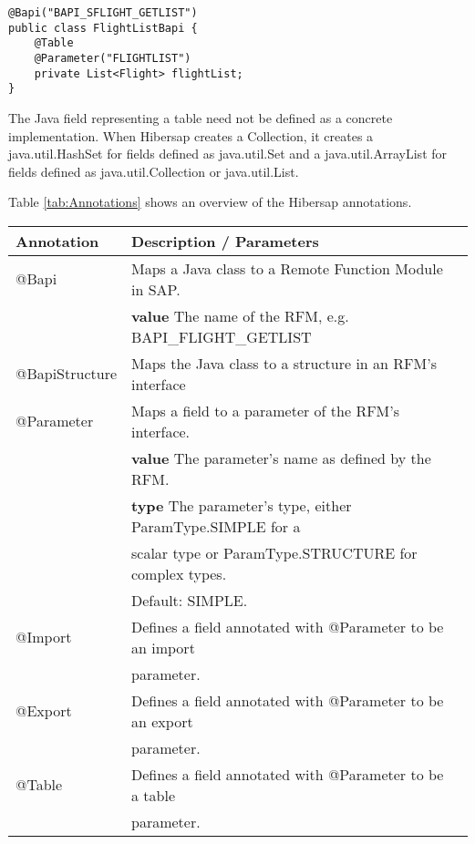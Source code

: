 \begin{Verbatim}[frame=single]
@Bapi("BAPI_SFLIGHT_GETLIST") 
public class FlightListBapi {
    @Table 
    @Parameter("FLIGHTLIST") 
    private List<Flight> flightList;
}
\end{Verbatim}

The Java field representing a table need not be defined as a concrete implementation. When Hibersap creates a Collection, it creates a java.util.HashSet for fields defined as java.util.Set and a java.util.ArrayList for fields defined as java.util.Collection or java.util.List.

Table \ref{tab:Annotations} shows an overview of the Hibersap annotations.

\begin{table}[H]
  \centering
  \begin{tabular}{lll} \toprule 
    \textbf{Annotation}     & \textbf{Description / Parameters} \\ \midrule
    @Bapi                   & Maps a Java class to a Remote Function Module in SAP.\\
                            & \textbf{value} The name of the RFM, e.g. BAPI\_FLIGHT\_GETLIST\\ 
    @BapiStructure          & Maps the Java class to a structure in an RFM's interface \\
    @Parameter              & Maps a field to a parameter of the RFM's interface.\\
                            & \textbf{value} The parameter's name as defined by the RFM. \\
                            & \textbf{type} The parameter's type, either ParamType.SIMPLE for a \\
                            &               scalar type or ParamType.STRUCTURE for complex types. \\
                            &               Default: SIMPLE. \\
    @Import                 & Defines a field annotated with @Parameter to be an import \\
                            & parameter. \\
    @Export                 & Defines a field annotated with @Parameter to be an export \\
                            & parameter. \\
    @Table                  & Defines a field annotated with @Parameter to be a table \\
                            & parameter. \\

\end{tabular}
\end{table}
